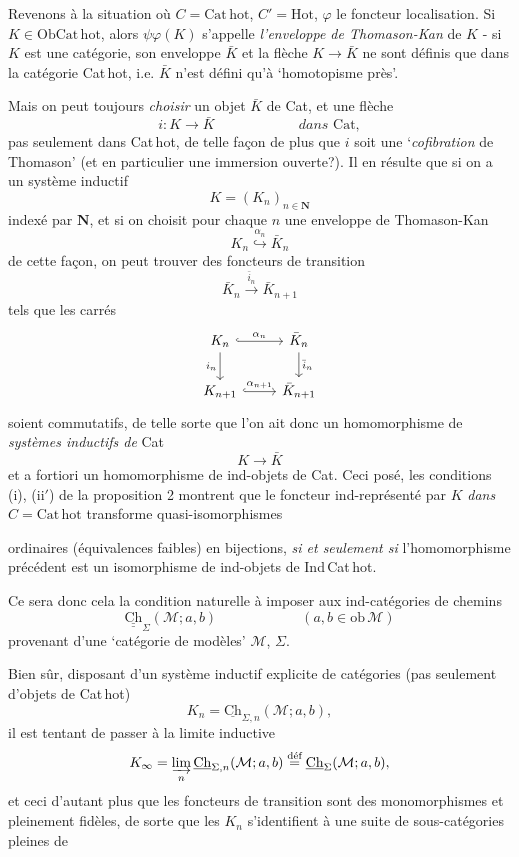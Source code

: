 \documentclass[11pt]{article}
\newcommand{\printedpage}[1]{\marginpar{\footnotesize p.~#1}}
\newcommand{\msp}[1]{\marginpar{\footnotesize [#1]}}
\newcommand{\Cat}{\mathrm{Cat}}
\newcommand{\Cathot}{\mathrm{Cat\,hot}}
\newcommand{\Hot}{\mathrm{Hot}}
\newcommand{\Ob}{\mathrm{Ob}}
\newcommand{\Ch}{\mathrm{Ch}}
\newcommand{\Chh}{\underline{\underline{\mathrm{Ch}}}}
\begin{document}
Revenons à la situation où $C = \Cathot$, $C' = \Hot$, $\varphi$ le foncteur localisation. Si $K \in \Ob\Cathot$, alors $\psi\varphi(K)$ s'appelle \textit{l'enveloppe de Thomason-Kan} de $K$ - si $K$ est une catégorie, son enveloppe $\bar{K}$ et la flèche $K \longrightarrow \bar{K}$ ne sont définis que dans la catégorie Cat\,hot, i.e. $\bar{K}$ n'est défini qu'à `homotopisme près'. %

\noindent\msp{page 43}%
Mais on peut toujours \textit{choisir} un objet $\bar{K}$ de Cat, et une flèche
\[
i : K \longrightarrow \bar{K} \qquad\qquad\qquad \textit{dans } \Cat,
\]
\printedpage{28}
pas seulement dans Cat\,hot, de telle façon de plus que $i$ soit une `\textit{cofibration} de Thomason' (et en particulier une immersion ouverte?). Il en résulte que si on a un système inductif
\[
K = (K_n)_{n\in\mathbf{N}}
\]
indexé par $\mathbf{N}$, et si on choisit pour chaque $n$ une enveloppe de Thomason-Kan
\[
K_n \overset{\alpha_n}{\hookrightarrow} \bar{K}_n
\]
de cette façon, on peut trouver des foncteurs de transition
\[
\bar{K}_n \xrightarrow{\bar{i}_n} \bar{K}_{n+1}
\]
tels que les carrés
\[
\begin{tikzcd}
K_n \arrow[r,hook,"\alpha_n"] \arrow[d,"i_n"'] & \bar{K}_n \arrow[d,"\bar{i}_n"] \\
K_{n+1} \arrow[r,hook,"\alpha_{n+1}"] & \bar{K}_{n+1}
\end{tikzcd}
\]
soient commutatifs, de telle sorte que l'on ait donc un homomorphisme de \textit{systèmes inductifs de} Cat
\[
K \longrightarrow \bar{K}
\]
et a fortiori un homomorphisme de ind-objets de Cat. Ceci posé, les conditions (i), (ii$'$) de la proposition 2 montrent que le foncteur ind-représenté par $K$ \textit{dans} $C = \Cathot$ transforme quasi-isomorphismes

\noindent\msp{page 44}%
ordinaires (équivalences faibles) en bijections, \textit{si et seulement si} l'homomorphisme précédent est un isomorphisme de ind-objets de Ind\,Cat\,hot.

Ce sera donc cela la condition naturelle à imposer aux ind-catégories de chemins
\[
\Chh_{\Sigma}(\mathcal{M};a,b) \qquad\qquad\qquad (a,b \in \mathrm{ob}\,\mathcal{M})
\]
provenant d'une `catégorie de modèles' $\mathcal{M}$, $\Sigma$.

Bien sûr, disposant d'un système inductif explicite de catégories (pas seulement d'objets de Cat\,hot)
\[
K_n = \underline{\Ch}_{\Sigma,n}(\mathcal{M};a,b),
\]
il est tentant de passer à la limite inductive
\[
K_\infty = \varinjlim_n \underline{\Ch}_{\Sigma,n}(\mathcal{M};a,b) \overset{\text{déf}}{=} \underline{\Ch}_{\Sigma}(\mathcal{M};a,b),
\]
et ceci d'autant plus que les foncteurs de transition sont des monomorphismes et pleinement fidèles, de sorte que les $K_n$ s'identifient à une suite de sous-catégories pleines de
\end{document}
